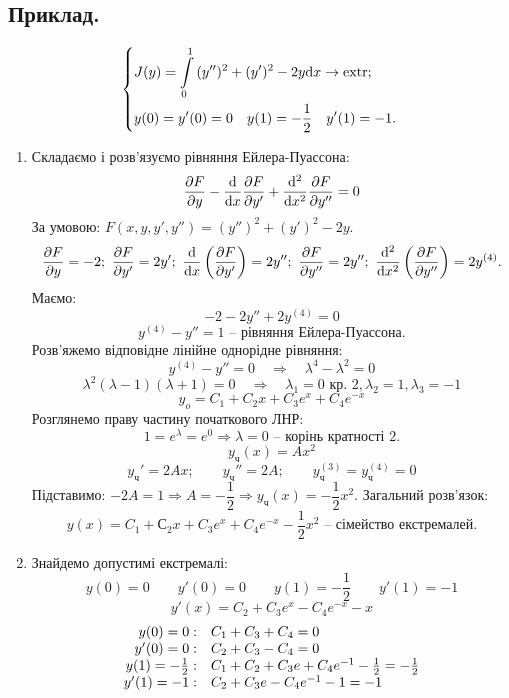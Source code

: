 \documentclass[14pt,a4paper]{scrartcl}
\theoremstyle{definition}
\theoremstyle{definition}
\theoremstyle{definition}
\begin{document}
\subsection*{Приклад.}
$$
\begin{dcases}
 J(y) =  \int\limits_{0}^{1}{ (y'')^2 + (y')^2 - 2 y  \mathrm{d} x } \to \mathrm{extr};\\
 y(0) = y' (0) = 0 \quad y(1) = - \frac{1}{2} \quad y'(1) = -1 .
\end{dcases}
$$
\begin{enumerate}
  \item Складаємо і розв'язуємо рівняння Ейлера-Пуассона:
  $$
  \frac{\d F}{\d y} - \frac{\mathrm{d}}{\mathrm{d} x} \frac{\d F}{\d y'} + \frac{\mathrm{d}^2}{ \mathrm{d} x ^2} \frac{\d F}{\d y''} = 0
  $$
  За умовою: $ F(x, y, y', y'') = (y'')^2 + (y' )^2 - 2y$.
  $$
  \frac{
  \d F
  }{
\d y
  } = -2 ; \  \frac{\d F}{\d y'} = 2 y' ; \  \frac{\mathrm{d}}{\mathrm{d} x} \left( \frac{\d F}{
  \d y'
  }  \right)  = 2 y'' ; \  \frac{\d F}{\d y''
  }  = 2y''; \  \frac{\mathrm{d}^2}{ \mathrm{d} x^2} \left( \frac{\d F}{\d y''}  \right)  = 2 y^{(4)}.
  $$
Маємо:
$$
-2 - 2 y'' + 2 y^{(4)} = 0
$$
$$
y^{(4)} - y'' = 1 \text{ -- рівняння Ейлера-Пуассона.}
$$
Розв'яжемо відповідне лінійне однорідне рівняння:
$$
y^{(4)} - y'' = 0
\quad \Longrightarrow \quad \lambda^4 - \lambda^2 = 0
$$
$$
\lambda^2 (\lambda-1) (\lambda+1 ) = 0 \quad \Longrightarrow \quad \lambda_1 = 0 \text{ кр. 2} ,
\lambda_2 = 1 , \lambda_3 = -1
$$
$$
y_o = C_1 + C_2x + C_3 e^x + C_4 e^{-x}
$$
Розглянемо праву частину початкового ЛНР:
$$
1 = e^{\lambda} = e^0  \Longrightarrow \lambda = 0 \text{ -- корінь кратності 2.}
$$
$$
y_{\text{ч}} (x) = Ax^2
$$
$$
y_{\text{ч}}' = 2Ax ; \qquad  y_{\text{ч}}'' = 2 A ; \qquad  y_{\text{ч}}^{(3)} = y_{\text{ч}}^{(4)} = 0
$$
Підставимо: $-2 A = 1 \Rightarrow A= - \dfrac{1}{2} \Rightarrow y_{\text{ч}}(x) = -  \dfrac{1}{2} x^2$. Загальний розв'язок:
$$
y(x) = C_1 + С_2 x + C_3 e^x + C_4 e^{-x} - \frac{1}{2} x^2 \textit{ -- сімейство екстремалей.}
$$
\item Знайдемо допустимі екстремалі:
$$
y(0) = 0 \qquad y'(0) =0 \qquad y(1) = -  \frac{1}{2}  \qquad y' (1) = -1
$$
$$
y' (x) = C_2 + C_3 e^{x} - C_4 e^{-x} - x
$$
$$
\begin{array}{r l}
y(0) = 0: & C_1 + C_3 + C_4 = 0\\
y'(0) = 0 : &C_2 + C_3 - C_4 = 0 \\
y(1) = - \frac{1}{2} : &  C_1 + C_2 + C_3 e + C_4 e^{-1 } - \frac{1}{2} = - \frac{1}{2}\\
y'(1) = -1 : & C_2 + C_3 e - C_4 e^{-1}  -1 = -1

\end{array}$$
\end{enumerate}
\end{document}
